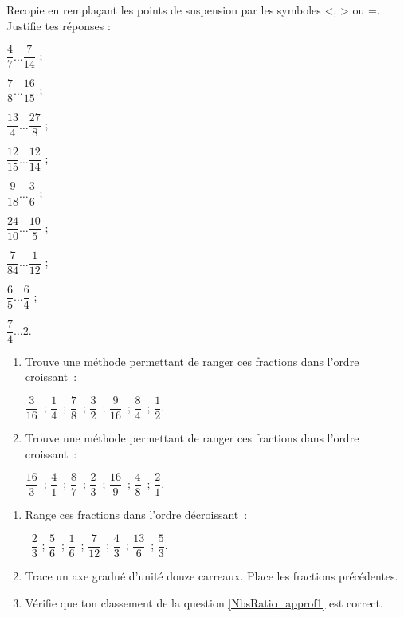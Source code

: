 \begin{exercice}
Recopie en remplaçant les points de suspension par les symboles <, > ou =. Justifie tes réponses :
\begin{colenumerate}{3}
 \item $\dfrac{4}{7} \ldots \dfrac{7}{14}$ ; 
 \vspace{0.2cm}
 \item $\dfrac{7}{8} \ldots \dfrac{16}{15}$ ;
 \vspace{0.2cm}
 \item $\dfrac{13}{4} \ldots \dfrac{27}{8}$ ; 
 \item $\dfrac{12}{15} \ldots \dfrac{12}{14}$ ; 
 \item $\dfrac{9}{18} \ldots \dfrac{3}{6}$ ; 
 \item $\dfrac{24}{10} \ldots \dfrac{10}{5}$ ; 
 \item $\dfrac{7}{84} \ldots \dfrac{1}{12}$ ; 
 \item $\dfrac{6}{5} \ldots \dfrac{6}{4}$ ; 
 \item $\dfrac{7}{4} \ldots 2$.
 \end{colenumerate}
\end{exercice}


\begin{exercice}[De l'ordre !]
\begin{enumerate}
 \item Trouve une méthode permettant de ranger ces fractions dans l'ordre croissant : \\[0.1em]
 \begin{center} $\dfrac{3}{16}$ ; $\dfrac{1}{4}$ ; $\dfrac{7}{8}$ ; $\dfrac{3}{2}$ ; $\dfrac{9}{16}$ ; $\dfrac{8}{4}$ ; $\dfrac{1}{2}$. \end{center}
 \vspace{0.2cm}
 \item Trouve une méthode permettant de ranger ces fractions dans l'ordre croissant : \\[0.1em]
 \begin{center} $\dfrac{16}{3}$ ; $\dfrac{4}{1}$ ; $\dfrac{8}{7}$ ; $\dfrac{2}{3}$ ; $\dfrac{16}{9}$ ; $\dfrac{4}{8}$ ; $\dfrac{2}{1}$. \end{center}
 \end{enumerate}
\end{exercice}


\begin{exercice}
\begin{enumerate}
 \item Range ces fractions dans l'ordre décroissant : \\[0.1em] \label{NbsRatio_approf1}
\begin{center} $\dfrac{2}{3}$ ; $\dfrac{5}{6}$ ; $\dfrac{1}{6}$ ; $\dfrac{7}{12}$ ; $\dfrac{4}{3}$ ; $\dfrac{13}{6}$ ; $\dfrac{5}{3}$. \end{center}
 \vspace{0.2cm}
 \item Trace un axe gradué d'unité douze carreaux. Place les fractions précédentes.
 \item Vérifie que ton classement de la question \ref{NbsRatio_approf1} est correct.
 \end{enumerate}
\end{exercice}


